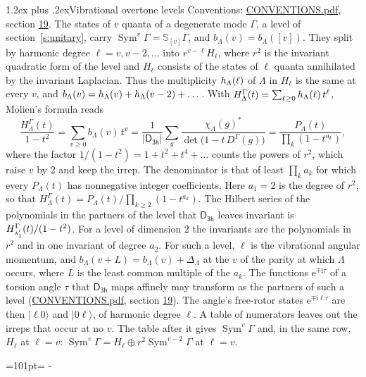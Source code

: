 \documentclass[10pt,a4paper]{article}
\makeatletter
\renewcommand\section{\@startsection{section}{1}{\z@}{-3ex plus -1ex minus -.2ex}%
  {1.2ex plus .2ex}{\normalfont\large\sffamily\bfseries\color{parttitle}}}
\newcommand{\needspace}[1]{\par\penalty-100\begingroup\dimen0=#1\relax\dimen2=\pagegoal
  \advance\dimen2-\pagetotal\ifdim\dimen0>\dimen2\relax\ifdim\dimen2>0pt\vfil\break\fi\fi
  \endgroup}
\numberwithin{equation}{section}
\newcommand{\grp}[1]{\mathsf{#1}}
\newcommand{\irr}[1]{\text{\normalfont\scshape #1}}
\newcommand{\iunit}{\mathrm{i}}
\newcommand{\expe}{\mathrm{e}}
\newcommand{\repD}[1]{D^{#1}}
\newcommand{\irchar}[1]{\chi_{#1}}
\newcommand{\conj}[1]{{#1}^{*}}
\newcommand{\schur}[1]{\mathbb{S}_{#1}}
\newcommand{\shape}[1]{[#1]}
\newcommand{\occ}[1]{\lvert #1\rangle}
\makeatother
\begin{document}
\section{Vibrational overtone levels}\label{s:overtones}
Conventions: \href{../../CONVENTIONS.pdf}{CONVENTIONS.pdf}, section \href{../../CONVENTIONS.pdf\#conv.19}{19}.
\leavevmode\label{n:index.quanta}\label{n:operator.symmetric.power}The states of $v$ quanta of a degenerate mode $\Gamma$, a level of section~\ref{s:unitary}, carry $\operatorname{Sym}^{v}\Gamma = \schur{\shape{v}}\Gamma$, and $b_\Lambda(v) = b_\Lambda(\shape{v})$. \label{n:local.quadratic.form}\label{n:set.harmonic}They split by harmonic degree $\ell = v, v - 2, \dots$ into $r^{v-\ell}H_\ell$, where $r^2$ is the invariant quadratic form of the level and $H_\ell$ consists of the states of $\ell$ quanta annihilated by the invariant Laplacian. \label{n:function.multiplicity.harmonic}Thus the multiplicity $\mathnormal{h}_\Lambda(\ell)$ of $\Lambda$ in $H_\ell$ is the same at every $v$, and $b_\Lambda(v) = \mathnormal{h}_\Lambda(v) + \mathnormal{h}_\Lambda(v - 2) + \dots$. \label{n:function.generating.level}With $H^{\Gamma}_\Lambda(t) = \sum_{\ell\ge0} \mathnormal{h}_\Lambda(\ell)\,t^{\ell}$, Molien's formula reads
\begin{equation}\label{e:molien}\frac{H^{\Gamma}_\Lambda(t)}{1 - t^2} = \sum_{v\ge0} b_\Lambda(v)\,t^v = \frac{1}{|\grp{D_{3h}}|}\sum_{g}\frac{\conj{\irchar{\Lambda}(g)}}{\det\bigl(1 - t\,\repD{\Gamma}(g)\bigr)} = \frac{P_\Lambda(t)}{\prod_k (1-t^{a_k})},\end{equation}
where the factor $1/(1 - t^2) = 1 + t^2 + t^4 + \dots$ counts the powers of $r^2$, which raise $v$ by 2 and keep the irrep. The denominator is that of least $\prod_k a_k$ for which every $P_\Lambda(t)$ has nonnegative integer coefficients. Here $a_1 = 2$ is the degree of $r^2$, so that $H^{\Gamma}_\Lambda(t) = P_\Lambda(t)/\prod_{k\ge2}(1 - t^{a_k})$. The Hilbert series of the polynomials in the partners of the level that $\grp{D_{3h}}$ leaves invariant is $H^{\Gamma}_{\irr{a}_{1}'}(t)/(1 - t^2)$. For a level of dimension 2 the invariants are the polynomials in $r^2$ and in one invariant of degree $a_2$. \label{n:index.overtone.period}\label{n:index.increment.unitary}For such a level, $\ell$ is the vibrational angular momentum, and $b_\Lambda(v + L) = b_\Lambda(v) + \Delta_\Lambda$ at the $v$ of the parity at which $\Lambda$ occurs, where $L$ is the least common multiple of the $a_k$. \label{n:local.torsion.angle}The functions $\expe^{\mp\iunit\tau}$ of a torsion angle $\tau$ that $\grp{D_{3h}}$ maps affinely may transform as the partners of such a level (\href{../../CONVENTIONS.pdf}{CONVENTIONS.pdf}, section \href{../../CONVENTIONS.pdf\#conv.19}{19}). The angle's free-rotor states $\expe^{\mp\iunit\ell\tau}$ are then $\occ{\ell 0}$ and $\occ{0 \ell}$, of harmonic degree $\ell$. A table of numerators leaves out the irreps that occur at no $v$. The table after it gives $\operatorname{Sym}^{v}\Gamma$ and, in the same row, $H_\ell$ at $\ell = v$: $\operatorname{Sym}^{v}\Gamma = H_\ell \oplus r^2\operatorname{Sym}^{v-2}\Gamma$ at $\ell = v$.
\needspace{101pt}
\end{document}
